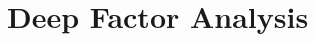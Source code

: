 \documentclass[../main.tex]{subfiles}
\begin{document}
\section{Deep Factor Analysis}
\end{document}
